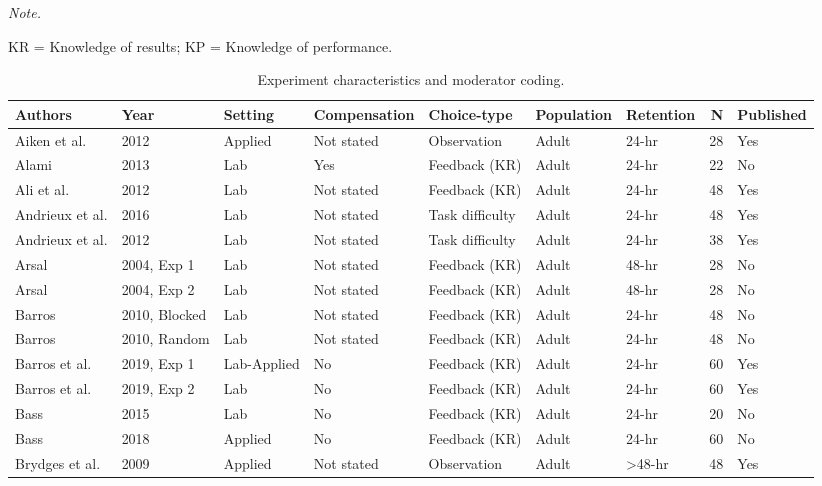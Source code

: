 \documentclass[
  english,
  man,floatsintext]{apa7}
\begin{document}
\begin{landscape}
\begin{ThreePartTable}
\begin{TableNotes}
\item \textit{Note.} 
\item KR = Knowledge of results; KP = Knowledge of performance.
\end{TableNotes}
\begin{longtable}[l]{lllllllrl}
\caption{\label{tab:table1}Experiment characteristics and moderator coding.}\\
\toprule
Authors & Year & Setting & Compensation & Choice-type & Population & Retention & N & Published\\
\midrule
Aiken et al. & 2012 & Applied & Not stated & Observation & Adult & 24-hr & 28 & Yes\\
\addlinespace
Alami & 2013 & Lab & Yes & Feedback (KR) & Adult & 24-hr & 22 & No\\
\addlinespace
Ali et al. & 2012 & Lab & Not stated & Feedback (KR) & Adult & 24-hr & 48 & Yes\\
\addlinespace
Andrieux et al. & 2016 & Lab & Not stated & Task difficulty & Adult & 24-hr & 48 & Yes\\
\addlinespace
Andrieux et al. & 2012 & Lab & Not stated & Task difficulty & Adult & 24-hr & 38 & Yes\\
\addlinespace
Arsal & 2004, Exp 1 & Lab & Not stated & Feedback (KR) & Adult & 48-hr & 28 & No\\
\addlinespace
Arsal & 2004, Exp 2 & Lab & Not stated & Feedback (KR) & Adult & 48-hr & 28 & No\\
\addlinespace
Barros & 2010, Blocked & Lab & Not stated & Feedback (KR) & Adult & 24-hr & 48 & No\\
\addlinespace
Barros & 2010, Random & Lab & Not stated & Feedback (KR) & Adult & 24-hr & 48 & No\\
\addlinespace
Barros et al. & 2019, Exp 1 & Lab-Applied & No & Feedback (KR) & Adult & 24-hr & 60 & Yes\\
\addlinespace
Barros et al. & 2019, Exp 2 & Lab & No & Feedback (KR) & Adult & 24-hr & 60 & Yes\\
\addlinespace
Bass & 2015 & Lab & No & Feedback (KR) & Adult & 24-hr & 20 & No\\
\addlinespace
Bass & 2018 & Applied & No & Feedback (KR) & Adult & 24-hr & 60 & No\\
\addlinespace
Brydges et al. & 2009 & Applied & Not stated & Observation & Adult & >48-hr & 48 & Yes\\

\end{longtable}
\end{ThreePartTable}
\end{landscape}
\end{document}
